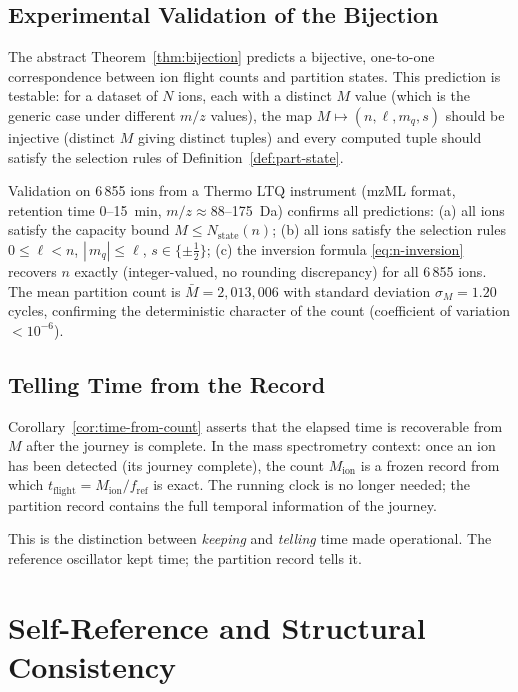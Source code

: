 \documentclass[twocolumn,10pt,a4paper]{article}
\theoremstyle{thmstyle}
\theoremstyle{definition}
\theoremstyle{remark}
\newcommand{\Nstate}{N_{\mathrm{state}}}
\begin{document}
\subsection{Experimental Validation of the Bijection}

The abstract Theorem~\ref{thm:bijection} predicts a bijective, one-to-one correspondence between ion flight counts and partition states. This prediction is testable: for a dataset of $N$ ions, each with a distinct $M$ value (which is the generic case under different $m/z$ values), the map $M \mapsto (n, \ell, m_q, s)$ should be injective (distinct $M$ giving distinct tuples) and every computed tuple should satisfy the selection rules of Definition~\ref{def:part-state}.

Validation on 6\,855 ions from a Thermo LTQ instrument (mzML format, retention time 0--15~min, $m/z \approx 88$--175~Da) confirms all predictions: (a) all ions satisfy the capacity bound $M \leq \Nstate(n)$; (b) all ions satisfy the selection rules $0 \leq \ell < n$, $|\,m_q| \leq \ell$, $s \in \{\pm\tfrac{1}{2}\}$; (c) the inversion formula \eqref{eq:n-inversion} recovers $n$ exactly (integer-valued, no rounding discrepancy) for all 6\,855 ions. The mean partition count is $\bar{M} = 2{,}013{,}006$ with standard deviation $\sigma_M = 1.20$ cycles, confirming the deterministic character of the count (coefficient of variation $< 10^{-6}$).

\subsection{Telling Time from the Record}

Corollary~\ref{cor:time-from-count} asserts that the elapsed time is recoverable from $M$ after the journey is complete. In the mass spectrometry context: once an ion has been detected (its journey complete), the count $M_{\mathrm{ion}}$ is a frozen record from which $t_{\mathrm{flight}} = M_{\mathrm{ion}} / f_{\mathrm{ref}}$ is exact. The running clock is no longer needed; the partition record contains the full temporal information of the journey.

This is the distinction between \emph{keeping} and \emph{telling} time made operational. The reference oscillator kept time; the partition record tells it.

\section{Self-Reference and Structural Consistency}
\label{sec:self-ref}
\end{document}
